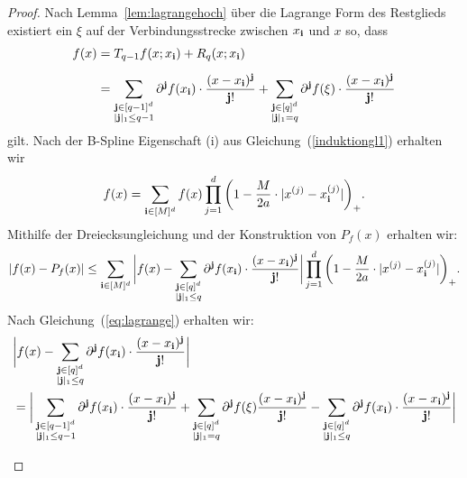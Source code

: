 \begin{proof}
Nach Lemma~\ref{lem:lagrangehoch} über die Lagrange Form des Restglieds existiert ein $\xi$ auf der Verbindungsstrecke zwischen $x_{\mathbf{i}}$ und $x$ so, dass 
\begin{equation}
\label{eq:lagrange}
\begin{split}
f(x) & = T_{q - 1}f(x; x_{\mathbf{i}}) + R_q(x; x_{\mathbf{i}})\\[0.5em]
& = \sum_{\substack{\mathbf{j} \in [q - 1]^d \\ |\mathbf{j}|_1 \leq q - 1}}  \partial^{\mathbf{j}}f(x_{\mathbf{i}}) \cdot \frac{ (x - x_{\mathbf{i}})^{\mathbf{j}} }{\mathbf{j}!} + \sum_{\substack{ \mathbf{j} \in [q]^d \\|\mathbf{j}|_1 = q}} \partial^{\mathbf{j}}f(\xi) \cdot \frac{ (x - x_{\mathbf{i}})^{\mathbf{j}} }{\mathbf{j}!}
\end{split}
\end{equation}
gilt.
Nach der B-Spline Eigenschaft (i) aus Gleichung~(\ref{induktiongl1}) erhalten wir 
$$f(x) = \sum_{\mathbf{i} \in [M]^d} f(x) \prod_{j = 1}^d \bigg(1 - \frac{M}{2a} \cdot |x^{(j)} - x_{\mathbf{i}}^{(j)}|\bigg)_+.$$ 
Mithilfe der Dreiecksungleichung und der Konstruktion von $P_f(x)$ erhalten wir:
\begin{equation}
\label{eq:drei}
\begin{split}
|f(x) - P_f(x)| \leq \sum_{\mathbf{i} \in [M]^d} \bigg|f(x) - \sum_{\substack{\mathbf{j} \in [q]^d \\|\mathbf{j}|_1 \leq q}} \partial^{\mathbf{j}}f(x_{\mathbf{i}}) \cdot \frac{(x - x_{\mathbf{i}})^{\mathbf{j}}}{\mathbf{j}!}\bigg| \prod_{j = 1}^d \bigg(1 - \frac{M}{2a} \cdot |x^{(j)} - x_{\mathbf{i}}^{(j)}|\bigg)_+.
\end{split}
\end{equation}
Nach Gleichung~(\ref{eq:lagrange}) erhalten wir:
\begin{equation}
\label{eq:sum}
\begin{split}
& \bigg|f(x) - \sum_{\substack{\mathbf{j} \in [q]^d \\|\mathbf{j}|_1 \leq q}} \partial^{\mathbf{j}}f(x_{\mathbf{i}}) \cdot \frac{(x - x_{\mathbf{i}})^{\mathbf{j}}}{\mathbf{j}!}\bigg| \\ 
& = \bigg| \sum_{\substack{\bj \in [q - 1]^d \\ |\bj|_1 \leq q - 1}}  \partial^{\bj}f(x_{\mathbf{i}}) \cdot \frac{ (x - x_{\mathbf{i}})^{\bj} }{\bj!} + \sum_{\substack{ \bj \in [q]^d \\|\bj|_1 = q}} \partial^{\bj}f(\xi) \frac{ (x - x_{\mathbf{i}})^{\bj} }{\bj!} - \sum_{\substack{\mathbf{j} \in [q]^d \\|\mathbf{j}|_1 \leq q}} \partial^{\mathbf{j}}f(x_{\mathbf{i}}) \cdot \frac{(x - x_{\mathbf{i}})^{\mathbf{j}}}{\mathbf{j}!}\bigg| \\[0.5em]

\end{split}
\end{equation}
\end{proof}

